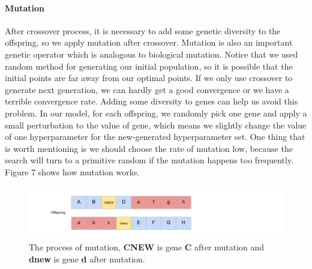 \documentclass[12pt]{article}
\begin{document}
\paragraph{Mutation}
After crossover process, it is necessary to add some genetic diversity to the offspring, so we apply mutation after crossover. Mutation is also an important genetic operator which is analogous to biological mutation. Notice that we used random method for generating our initial population, so it is possible that the initial points are far away from our optimal points. If we only use crossover to generate next generation, we can hardly get a good convergence or we have a terrible convergence rate. Adding some diversity to genes can help us avoid this problem. In our model, for each offspring, we randomly pick one gene and apply a small perturbation to the value of gene, which means we slightly change the value of one hyperparameter for the new-generated hyperparameter set. One thing that is worth mentioning is we should choose the rate of mutation low, because the search will turn to a primitive random if the mutation happens too frequently. Figure 7 shows how mutation works.
\begin{figure}
\begin{center}
\includegraphics[width =7.2in]{mutation.png}
\caption{The process of mutation, \textbf{CNEW} is gene \textbf{C} after mutation and \textbf{dnew} is gene \textbf{d} after mutation.}
\end{center}
\label{fig:pic7}
\end{figure}
\end{document}
